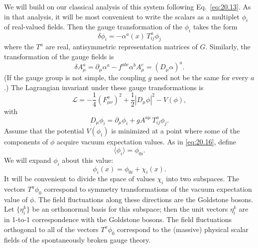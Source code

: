 We will build on our classical analysis of this system following
Eq.~\eqref{eq:20.13}.  As in that analysis, it will be most convenient to
write the scalars as a multiplet $\phi_i$ of real-valued fields.  Then the
gauge transformation of the $\phi_i$ takes the form
\begin{equation}
  \delta\phi_i = -\alpha^a(x)\,T^a_{ij}\phi_j
  \label{eq:21.30}
\end{equation}
where the $T^a$ are real, antisymmetric representation matrices of $G$.
Similarly, the transformation of the gauge fields is
\begin{equation}
  \delta A^a_\mu = \partial_\mu\alpha^a - f^{abc}\alpha^b A^c_\mu
  = (D_\mu\alpha)^a .
  \label{eq:21.31}
\end{equation}
(If the gauge group is not simple, the coupling $g$ need not be the same for
every $a$.)  The Lagrangian invariant under these gauge transformations is
\begin{equation}
  \mathcal{L} = -\frac{1}{4}(F^a_{\mu\nu})^2 + \frac{1}{2}|D_\mu\phi|^2
    - V(\phi) ,
  \label{eq:21.32}
\end{equation}
with
\begin{equation}
  D_\mu\phi_i = \partial_\mu\phi_i + gA^{a\mu}\,T^a_{ij}\phi_j .
  \label{eq:21.33}
\end{equation}
Assume that the potential $V(\phi_i)$ is minimized at a point where some of
the components of $\phi$ acquire vacuum expectation values.  As in
\eqref{eq:20.16}, define
\begin{equation}
  \langle\phi_i\rangle = \phi_{0i} .
  \label{eq:21.34}
\end{equation}
We will expand $\phi_i$ about this value:
\begin{equation}
  \phi_i(x) = \phi_{0i} + \chi_i(x) .
  \label{eq:21.35}
\end{equation}
It will be convenient to divide the space of values $\chi_i$ into two
subspaces.  The vectors $T^a\phi_0$ correspond to symmetry transformations of
the vacuum expectation value of $\phi$.  The field fluctuations along these
directions are the Goldstone bosons.  Let $\{\eta_i^k\}$ be an orthonormal
basis for this subspace; then the unit vectors $\eta_i^k$ are in 1-to-1
correspondence with the Goldstone bosons.  The field fluctuations orthogonal
to all of the vectors $T^a\phi_0$ correspond to the (massive) physical scalar
fields of the spontaneously broken gauge theory.

